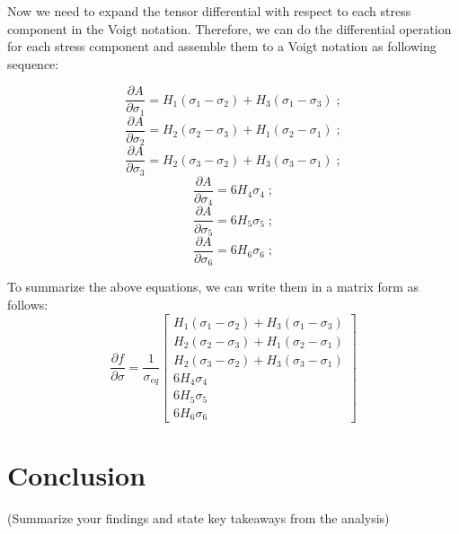 \documentclass[12pt]{article}
\begin{document}
Now we need to expand the tensor differential with respect to each stress component in 
the Voigt notation. Therefore, we can do the differential operation for each stress 
component and assemble them to a Voigt notation as following sequence:

\[
\frac{\partial{A}}{\partial{\sigma_1}} = H_{1}(\sigma_1-\sigma_2) + H_3(\sigma_1-\sigma_3) \;;
\]
\[
\frac{\partial{A}}{\partial{\sigma_2}} = H_{2}(\sigma_2-\sigma_3) + H_1(\sigma_2-\sigma_1) \;;
\]
\[
\frac{\partial{A}}{\partial{\sigma_3}} = H_{2}(\sigma_3-\sigma_2) + H_3(\sigma_3-\sigma_1) \;;
\]
\[
\frac{\partial{A}}{\partial{\sigma_4}} = 6H_{4}\sigma_4 \;;
\]
\[
\frac{\partial{A}}{\partial{\sigma_5}} = 6H_{5}\sigma_5 \;;
\]
\[
\frac{\partial{A}}{\partial{\sigma_6}} = 6H_{6}\sigma_6 \;;
\]

To summarize the above equations, we can write them in a matrix form as follows:
\begin{equation}
\frac{\partial{f}}{\partial{\sigma}} = \frac{1}{\sigma_{eq}}\begin{bmatrix}
H_{1}(\sigma_1-\sigma_2) + H_3(\sigma_1-\sigma_3) \\    
H_{2}(\sigma_2-\sigma_3) + H_1(\sigma_2-\sigma_1) \\
H_{2}(\sigma_3-\sigma_2) + H_3(\sigma_3-\sigma_1) \\
6H_{4}\sigma_4 \\
6H_{5}\sigma_5 \\
6H_{6}\sigma_6
\end{bmatrix}
\end{equation}




\section*{Conclusion}
(Summarize your findings and state key takeaways from the analysis)
\end{document}
